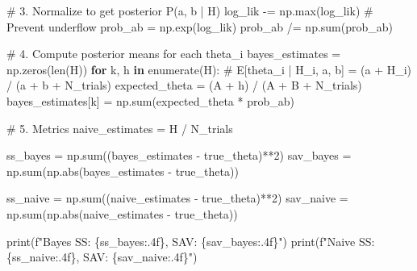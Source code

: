\documentclass[
  letterpaper,
  DIV=11,
  numbers=noendperiod]{scrartcl}
\newenvironment{Shaded}{\begin{snugshade}}{\end{snugshade}}
\newcommand{\BuiltInTok}[1]{\textcolor[rgb]{0.00,0.23,0.31}{#1}}
\newcommand{\CommentTok}[1]{\textcolor[rgb]{0.37,0.37,0.37}{#1}}
\newcommand{\ControlFlowTok}[1]{\textcolor[rgb]{0.00,0.23,0.31}{\textbf{#1}}}
\newcommand{\DecValTok}[1]{\textcolor[rgb]{0.68,0.00,0.00}{#1}}
\newcommand{\KeywordTok}[1]{\textcolor[rgb]{0.00,0.23,0.31}{\textbf{#1}}}
\newcommand{\NormalTok}[1]{\textcolor[rgb]{0.00,0.23,0.31}{#1}}
\newcommand{\OperatorTok}[1]{\textcolor[rgb]{0.37,0.37,0.37}{#1}}
\newcommand{\SpecialCharTok}[1]{\textcolor[rgb]{0.37,0.37,0.37}{#1}}
\newcommand{\SpecialStringTok}[1]{\textcolor[rgb]{0.13,0.47,0.30}{#1}}
\begin{document}
\begin{Shaded}
\begin{Highlighting}[]
\CommentTok{\# 3. Normalize to get posterior P(a, b | H)}
\NormalTok{log\_lik }\OperatorTok{{-}=}\NormalTok{ np.}\BuiltInTok{max}\NormalTok{(log\_lik)  }\CommentTok{\# Prevent underflow}
\NormalTok{prob\_ab }\OperatorTok{=}\NormalTok{ np.exp(log\_lik)}
\NormalTok{prob\_ab }\OperatorTok{/=}\NormalTok{ np.}\BuiltInTok{sum}\NormalTok{(prob\_ab)}

\CommentTok{\# 4. Compute posterior means for each theta\_i}
\NormalTok{bayes\_estimates }\OperatorTok{=}\NormalTok{ np.zeros(}\BuiltInTok{len}\NormalTok{(H))}
\ControlFlowTok{for}\NormalTok{ k, h }\KeywordTok{in} \BuiltInTok{enumerate}\NormalTok{(H):}
    \CommentTok{\# E[theta\_i | H\_i, a, b] = (a + H\_i) / (a + b + N\_trials)}
\NormalTok{    expected\_theta }\OperatorTok{=}\NormalTok{ (A }\OperatorTok{+}\NormalTok{ h) }\OperatorTok{/}\NormalTok{ (A }\OperatorTok{+}\NormalTok{ B }\OperatorTok{+}\NormalTok{ N\_trials)}
\NormalTok{    bayes\_estimates[k] }\OperatorTok{=}\NormalTok{ np.}\BuiltInTok{sum}\NormalTok{(expected\_theta }\OperatorTok{*}\NormalTok{ prob\_ab)}

\CommentTok{\# 5. Metrics}
\NormalTok{naive\_estimates }\OperatorTok{=}\NormalTok{ H }\OperatorTok{/}\NormalTok{ N\_trials}

\NormalTok{ss\_bayes }\OperatorTok{=}\NormalTok{ np.}\BuiltInTok{sum}\NormalTok{((bayes\_estimates }\OperatorTok{{-}}\NormalTok{ true\_theta)}\OperatorTok{**}\DecValTok{2}\NormalTok{)}
\NormalTok{sav\_bayes }\OperatorTok{=}\NormalTok{ np.}\BuiltInTok{sum}\NormalTok{(np.}\BuiltInTok{abs}\NormalTok{(bayes\_estimates }\OperatorTok{{-}}\NormalTok{ true\_theta))}

\NormalTok{ss\_naive }\OperatorTok{=}\NormalTok{ np.}\BuiltInTok{sum}\NormalTok{((naive\_estimates }\OperatorTok{{-}}\NormalTok{ true\_theta)}\OperatorTok{**}\DecValTok{2}\NormalTok{)}
\NormalTok{sav\_naive }\OperatorTok{=}\NormalTok{ np.}\BuiltInTok{sum}\NormalTok{(np.}\BuiltInTok{abs}\NormalTok{(naive\_estimates }\OperatorTok{{-}}\NormalTok{ true\_theta))}

\BuiltInTok{print}\NormalTok{(}\SpecialStringTok{f"Bayes SS: }\SpecialCharTok{\{}\NormalTok{ss\_bayes}\SpecialCharTok{:.4f\}}\SpecialStringTok{, SAV: }\SpecialCharTok{\{}\NormalTok{sav\_bayes}\SpecialCharTok{:.4f\}}\SpecialStringTok{"}\NormalTok{)}
\BuiltInTok{print}\NormalTok{(}\SpecialStringTok{f"Naive SS: }\SpecialCharTok{\{}\NormalTok{ss\_naive}\SpecialCharTok{:.4f\}}\SpecialStringTok{, SAV: }\SpecialCharTok{\{}\NormalTok{sav\_naive}\SpecialCharTok{:.4f\}}\SpecialStringTok{"}\NormalTok{)}
\end{Highlighting}
\end{Shaded}
\end{document}
